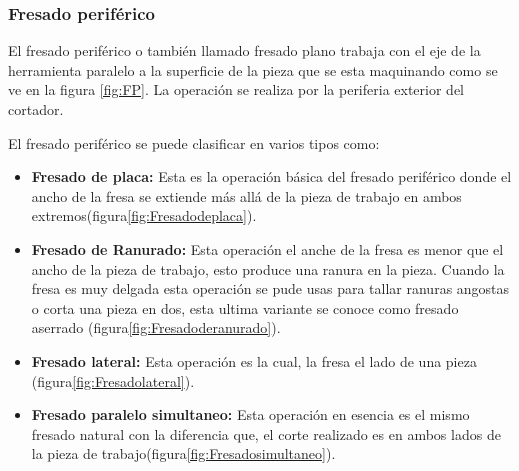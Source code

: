 \subsubsection*{Fresado periférico}
El fresado periférico o también llamado fresado plano trabaja con el eje de la herramienta paralelo a la superficie de la pieza que se esta maquinando como se ve en la figura \ref{fig:FP}. La operación se realiza por la periferia exterior del cortador.

El fresado periférico se puede clasificar en varios tipos como:
\begin{itemize}
    \item \textbf{Fresado de placa:} Esta es la operación básica del fresado periférico donde el ancho de la fresa se extiende más allá de la pieza de trabajo en ambos extremos(figura\ref{fig:Fresadodeplaca}). 
    \item \textbf{Fresado de Ranurado:} Esta operación el anche de la fresa es menor que el ancho de la pieza de trabajo, esto produce una ranura en la pieza. Cuando la fresa es muy delgada esta operación se pude usas para tallar ranuras angostas o corta una pieza en dos, esta ultima variante se conoce como fresado aserrado (figura\ref{fig:Fresadoderanurado}). 
    \item \textbf{Fresado lateral:} Esta operación es la cual, la fresa el lado de una pieza (figura\ref{fig:Fresadolateral}). 
    \item \textbf{Fresado paralelo simultaneo:} Esta operación en esencia es el mismo fresado natural con la diferencia que, el corte realizado es en ambos lados de la pieza de trabajo(figura\ref{fig:Fresadosimultaneo}).  
\end{itemize}

